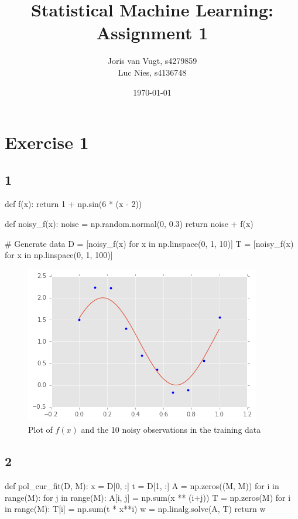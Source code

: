 \documentclass{article}
\title{Statistical Machine Learning: Assignment 1}
\author{Joris van Vugt, s4279859 \\ Luc Nies, s4136748}
\date{\today}
\begin{document}
\maketitle
\section*{Exercise 1}

\subsection*{1}
\begin{python}
def f(x):
    return 1 + np.sin(6 * (x - 2))

def noisy_f(x):
    noise = np.random.normal(0, 0.3)
    return noise + f(x)

# Generate data
D = [noisy_f(x) for x in np.linspace(0, 1, 10)]
T = [noisy_f(x) for x in np.linspace(0, 1, 100)]
\end{python}
\begin{figure}[H]
\centering
\includegraphics[width=.6\textwidth]{images/sin_d.png}
\caption{Plot of $f(x)$ and the 10 noisy observations in the training data}
\end{figure}

\subsection*{2}
\begin{python}
def pol_cur_fit(D, M):
    x = D[0, :]
    t = D[1, :]
    A = np.zeros((M, M))
    for i in range(M):
        for j in range(M):
            A[i, j] = np.sum(x ** (i+j))
    T = np.zeros(M)
    for i in range(M):
        T[i] = np.sum(t * x**i)
    w = np.linalg.solve(A, T)
    return w
\end{python}
\end{document}
